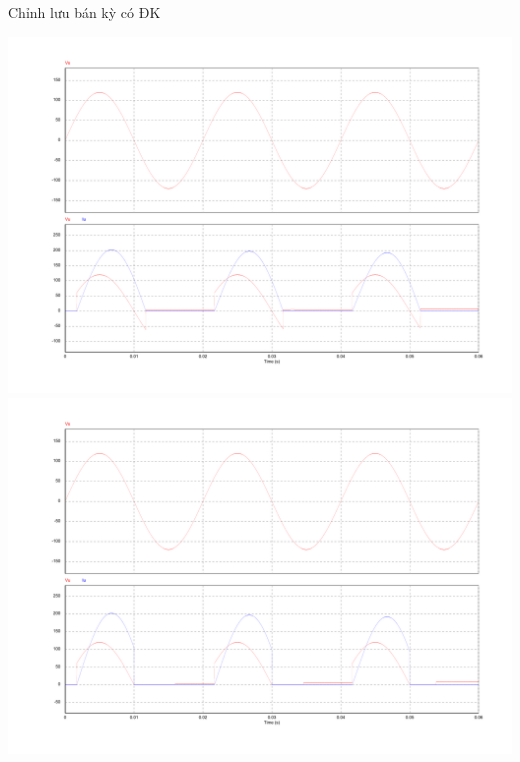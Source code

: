 \documentclass[24pt]{beamer}
\begin{document}
\begin{frame}{Chỉnh lưu bán kỳ có ĐK}
	\begin{center}
		\vspace{-.7cm}
		\includegraphics[scale=.2]{images-chude6/chinh-luu-1pha-co-dieu-khien-tai-motor-DC-plot-Vs-Vu-Iu-alpha-30.pdf}
		\includegraphics[scale=.2]{images-chude6/chinh-luu-1pha-co-dieu-khien-them-diode-zero-tai-motor-DC-plot-Vs-Vu-Iu-alpha-30.pdf} 
	\end{center}
\end{frame}
\end{document}
